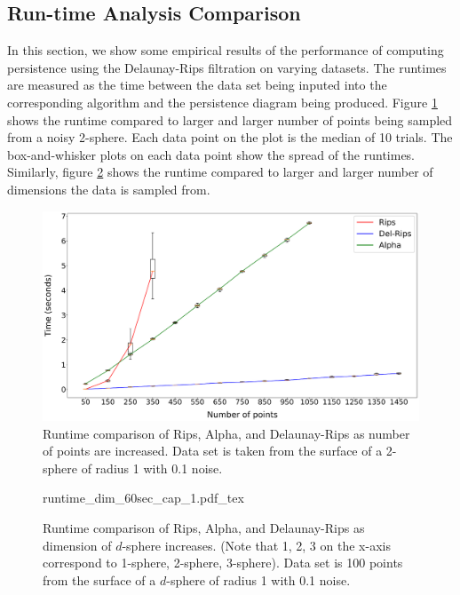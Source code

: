 \documentclass[letterpaper,titlepage]{article}
\newcommand{\incfig}[1]{%
    {#1.pdf_tex}
}
\begin{document}
\subsection{Run-time Analysis Comparison}
In this section, we show some empirical results of the performance of computing persistence using the Delaunay-Rips filtration on varying datasets. The runtimes are measured as the time between the data set being inputed into the corresponding algorithm and the persistence diagram being produced. Figure \ref{fig:runtime_pts} shows the runtime compared to larger and larger number of points being sampled from a noisy 2-sphere. Each data point on the plot is the median of 10 trials. The box-and-whisker plots on each data point show the spread of the runtimes. Similarly, figure \ref{fig:runtime_dim} shows the runtime compared to larger and larger number of dimensions the data is sampled from.
\begin{figure}[ht!]
    \centering
    \includegraphics[width=\columnwidth]{figures/runtime_pts_7sec_cap_3.eps}
    \caption{Runtime comparison of Rips, Alpha, and Delaunay-Rips as number of points are increased. Data set is taken from the surface of a 2-sphere of radius 1 with 0.1 noise.}
    \label{fig:runtime_pts}
\end{figure}

\begin{figure}[ht!]
    \centering
    \def\svgwidth{\textwidth}
    \incfig{runtime_dim_60sec_cap_1}
    \caption{Runtime comparison of Rips, Alpha, and Delaunay-Rips as dimension of $d$-sphere increases. (Note that 1, 2, 3 on the x-axis correspond to 1-sphere, 2-sphere, 3-sphere). Data set is 100 points from the surface of a $d$-sphere of radius 1 with 0.1 noise.}
    \label{fig:runtime_dim}
\end{figure}
\end{document}
